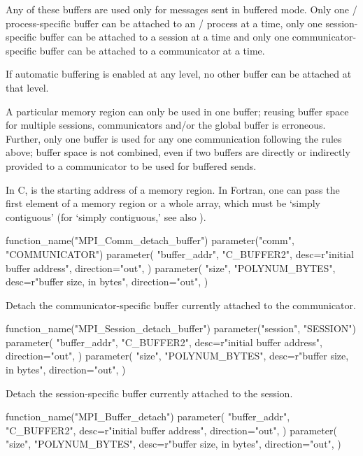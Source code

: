 Any of these buffers are used only for messages sent in buffered mode.
Only one \MPI/ process-specific buffer can be attached to an \MPI/ process at a time,
only one session-specific buffer can be attached to a session at a time and
only one communicator-specific buffer can be attached to a communicator at a time.

If automatic buffering is enabled at any level, no other buffer can be attached at that level.

A particular memory region can only be used in one buffer; reusing buffer space
for multiple sessions, communicators and/or the global buffer is erroneous.
Further, only one buffer is used for any one communication
following the rules above; buffer space is not combined, even if two buffers are directly
or indirectly provided  to a communicator to be used for buffered sends.

In C,  is the starting address of a memory region.
In Fortran, one can pass the first element of a memory region
or a whole array, which must be `simply contiguous'
(for `simply contiguous,' see also
).

\begin{mpi-binding}
    function_name("MPI_Comm_detach_buffer")
    parameter("comm", "COMMUNICATOR")
    parameter(
        "buffer_addr",
        "C_BUFFER2",
        desc=r"initial buffer address",
        direction="out",
    )
    parameter(
        "size",
        "POLYNUM_BYTES",
        desc=r"buffer size, in bytes",
        direction="out",
    )
\end{mpi-binding}

Detach the communicator-specific buffer currently attached to the communicator.


\begin{mpi-binding}
    function_name("MPI_Session_detach_buffer")
    parameter("session", "SESSION")
    parameter(
        "buffer_addr",
        "C_BUFFER2",
        desc=r"initial buffer address",
        direction="out",
    )
    parameter(
        "size",
        "POLYNUM_BYTES",
        desc=r"buffer size, in bytes",
        direction="out",
    )
\end{mpi-binding}

Detach the session-specific buffer currently attached to the session.

\begin{mpi-binding}
    function_name("MPI_Buffer_detach")
    parameter(
        "buffer_addr",
        "C_BUFFER2",
        desc=r"initial buffer address",
        direction="out",
    )
    parameter(
        "size",
        "POLYNUM_BYTES",
        desc=r"buffer size, in bytes",
        direction="out",
    )
\end{mpi-binding}

